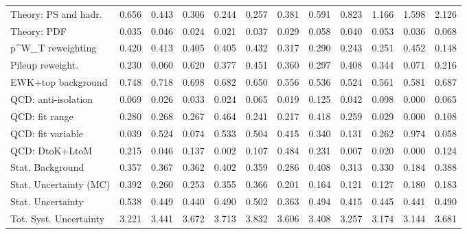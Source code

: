 \begin{tabular}{l|p{0.6cm}p{0.6cm}p{0.6cm}p{0.6cm}p{0.6cm}p{0.6cm}p{0.6cm}p{0.6cm}p{0.6cm}p{0.6cm}p{0.6cm}}
Theory: PS and hadr.                     & 0.656 & 0.443 & 0.306 & 0.244 & 0.257 & 0.381 & 0.591 & 0.823 & 1.166 & 1.598 & 2.126 \\
Theory: PDF                              & 0.035 & 0.046 & 0.024 & 0.021 & 0.037 & 0.029 & 0.058 & 0.040 & 0.053 & 0.036 & 0.068 \\
p^{W}_{T} reweighting                    & 0.420 & 0.413 & 0.405 & 0.405 & 0.432 & 0.317 & 0.290 & 0.243 & 0.251 & 0.452 & 0.148 \\
Pileup reweight.                         & 0.230 & 0.060 & 0.620 & 0.377 & 0.451 & 0.360 & 0.297 & 0.408 & 0.344 & 0.071 & 0.216 \\
EWK+top background                       & 0.748 & 0.718 & 0.698 & 0.682 & 0.650 & 0.556 & 0.536 & 0.524 & 0.561 & 0.581 & 0.687 \\
QCD: anti-isolation                      & 0.069 & 0.026 & 0.033 & 0.024 & 0.065 & 0.019 & 0.125 & 0.042 & 0.098 & 0.000 & 0.065 \\
QCD: fit range                           & 0.280 & 0.268 & 0.267 & 0.464 & 0.241 & 0.217 & 0.418 & 0.259 & 0.029 & 0.000 & 0.108 \\
QCD: fit variable                        & 0.039 & 0.524 & 0.074 & 0.533 & 0.504 & 0.415 & 0.340 & 0.131 & 0.262 & 0.974 & 0.058 \\
QCD: DtoK+LtoM                           & 0.215 & 0.046 & 0.137 & 0.002 & 0.107 & 0.484 & 0.231 & 0.007 & 0.020 & 0.000 & 0.124 \\
Stat. Background                         & 0.357 & 0.367 & 0.362 & 0.402 & 0.359 & 0.286 & 0.408 & 0.313 & 0.330 & 0.184 & 0.388 \\
Stat. Uncertainty (MC)                   & 0.392 & 0.260 & 0.253 & 0.355 & 0.366 & 0.201 & 0.164 & 0.121 & 0.127 & 0.180 & 0.183 \\
\hline
Stat. Uncertainty                        & 0.538 & 0.449 & 0.440 & 0.490 & 0.502 & 0.363 & 0.494 & 0.415 & 0.445 & 0.441 & 0.490 \\
\hline
Tot. Syst. Uncertainty                   & 3.221 & 3.441 & 3.672 & 3.713 & 3.832 & 3.606 & 3.408 & 3.257 & 3.174 & 3.144 & 3.681 \\
\hline
\end{tabular}
